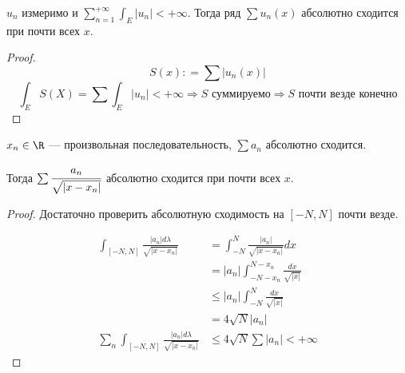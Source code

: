 \begin{corollary}
    \(u_n\) измеримо и
    \(\sum\limits_{n = 1}^{+\infty} \int_E |u_n| < +\infty\). Тогда ряд \(\sum u_n(x)\) абсолютно сходится при почти всех \(x\).
\end{corollary}
\begin{proof}
    \[S(x) : = \sum |u_n(x)|\]
    \[\int_E S(X) = \sum \int_E |u_n|< +\infty \Rightarrow S \text{ суммируемо} \Rightarrow S \text{ почти везде конечно}\]
\end{proof}

\begin{example}
    \(x_n\in\R\) --- произвольная последовательность, \(\sum a_n\) абсолютно сходится.

    Тогда \(\sum \cfrac{a_n}{\sqrt{|x - x_n|}}\) абсолютно сходится при почти всех \(x\).
\end{example}
\begin{proof}
    Достаточно проверить абсолютную сходимость на \([ - N, N]\) почти везде.

    \begin{align*}
        \int_{[ - N, N]} \frac{|a_n| d\lambda}{\sqrt{|x - x_n|}}
         & = \int_{ - N}^N \frac{|a_n|}{\sqrt{|x - x_n|}} dx        \\
         & = |a_n|\int_{ - N - x_n}^{N - x_n} \frac{dx}{\sqrt{|x|}} \\
         & \leq |a_n|\int_{ - N}^{N} \frac{dx}{\sqrt{|x|}}          \\
         & = 4 \sqrt{N} |a_n|                                       \\
        \sum_n\int_{[ - N, N]} \frac{|a_n| d\lambda}{\sqrt{|x - x_n|}}
         & \leq 4 \sqrt{N} \sum|a_n| < +\infty
    \end{align*}
\end{proof}
